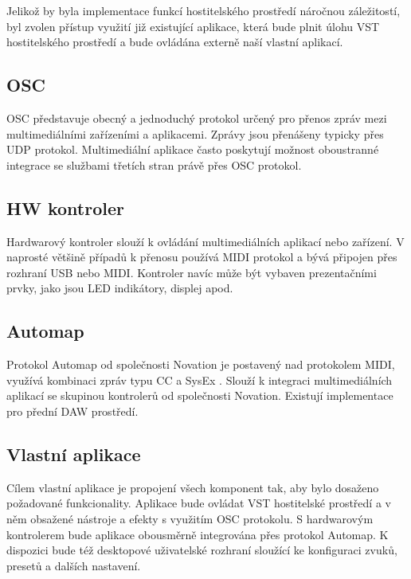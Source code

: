 \documentclass[thesis=M,czech]{FITthesis}[2019/03/06]
\begin{document}
			Jelikož by byla implementace funkcí hostitelského prostředí náročnou záležitostí, byl zvolen přístup využití
			již existující aplikace, která bude plnit úlohu VST hostitelského prostředí a bude ovládána externě naší vlastní aplikací.
			
		\subsection{OSC}		
			OSC představuje obecný a jednoduchý protokol určený pro přenos zpráv mezi multimediálními zařízeními a aplikacemi\cite{osc}.
			Zprávy jsou přenášeny typicky přes UDP protokol. Multimediální aplikace často poskytují možnost oboustranné integrace
			se službami třetích stran právě přes OSC protokol.

		\subsection{HW kontroler}
			Hardwarový kontroler slouží k ovládání multimediálních aplikací nebo zařízení. V naprosté většině případů k přenosu používá MIDI protokol
			a bývá připojen přes rozhraní USB nebo MIDI. Kontroler navíc může být vybaven prezentačními prvky, jako jsou LED indikátory, displej apod.

		\subsection{Automap}
			Protokol Automap od společnosti Novation je postavený nad protokolem MIDI, využívá kombinaci zpráv typu CC a SysEx \cite{midi}\cite{automap}.
			Slouží k integraci multimediálních aplikací se skupinou kontrolerů od společnosti Novation. Existují implementace pro 
			přední DAW prostředí.

		\subsection{Vlastní aplikace}
			Cílem vlastní aplikace je propojení všech komponent tak, aby bylo dosaženo požadované funkcionality.
			Aplikace bude ovládat VST hostitelské prostředí a v něm obsažené nástroje a efekty s využitím OSC protokolu.
			S hardwarovým kontrolerem bude aplikace obousměrně integrována přes protokol Automap.
			K dispozici bude též desktopové uživatelské rozhraní sloužící ke konfiguraci zvuků, presetů a dalších nastavení.
\clearpage
\end{document}
